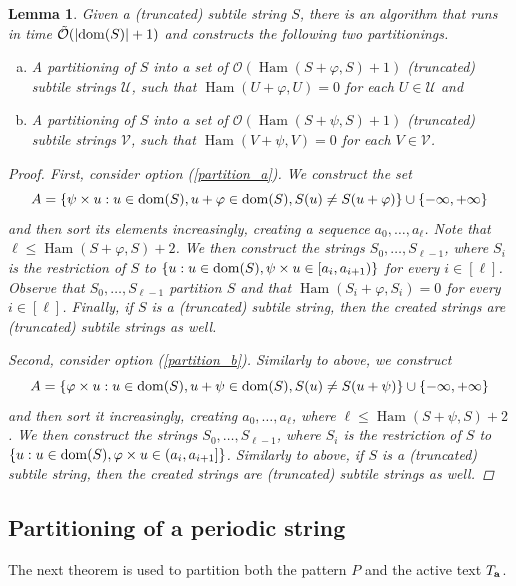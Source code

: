 \documentclass[11pt, letterpaper]{article}
\theoremstyle{plain}
\newtheorem{lemma}{Lemma}
\theoremstyle{definition}
\theoremstyle{remark}
\renewcommand{\O}{\mathcal{O}}
\newcommand{\tO}{\tilde{\mathcal{O}}}
\newcommand{\U}{\mathcal{U}}
\newcommand{\V}{\mathcal{V}}
\renewcommand{\phi}{\varphi}
\newcommand{\set}[1]{\left\lbrace #1 \right\rbrace}
\DeclareMathOperator*{\Ham}{Ham}
\newcommand{\absolute}[1]{\left\lvert#1\right\rvert}
\begin{document}
\begin{lemma}\label{cut_partitioning}
Given a (truncated) subtile string $S$, there is an algorithm that runs in time $\tO(\absolute{\d{S}} + 1)$ and constructs the following two partitionings.
	\begin{enumerate}[(a)]
		\item A partitioning of $S$ into a set of $\O(\Ham(S + \phi, S) + 1)$ (truncated) subtile strings $\U$, such that $\Ham(U + \phi, U) = 0$ for each $U \in \U$ and \label{partition_a}
		\item A partitioning of $S$ into a set of $\O(\Ham(S + \psi, S) + 1)$ (truncated) subtile strings $\V$, such that $\Ham(V + \psi, V) = 0$ for each $V \in \V$. \label{partition_b}
	\end{enumerate}
	\begin{proof}
		First, consider option (\ref{partition_a}). We construct the set
		\[ A = \set{\s{u} : u \in \d{S}, u + \phi \in \d{S}, S(u) \neq S(u + \phi)} \cup \set{-\infty, +\infty}\]
		and then sort its elements increasingly, creating a sequence $a_0, \dots, a_\ell$.
		Note that $\ell \le \Ham(S + \phi, S) + 2$.
		We then construct the strings $S_0, \dots, S_{\ell - 1}$, where $S_i$ is the restriction of $S$ to
		$\set{u : u \in \d{S}, \s{u} \in [a_i, a_{i + 1})}$ for every $i \in [\ell]$.
		Observe that $S_0, \dots, S_{\ell - 1}$ partition $S$ and that $\Ham(S_i + \phi, S_i) = 0$ for every $i \in [\ell]$. Finally, if $S$ is a (truncated) subtile string, then the created strings are (truncated) subtile strings as well.
	
		Second, consider option (\ref{partition_b}). Similarly to above, we construct
		\[ A = \set{\h{u} : u \in \d{S}, u + \psi \in \d{S}, S(u) \neq S(u + \psi)} \cup \set{-\infty, +\infty} \]
		and then sort it increasingly, creating $a_0, \dots, a_\ell$, where $\ell \le \Ham(S + \psi, S) + 2$.
		We then construct the strings $S_0, \dots, S_{\ell - 1}$, where $S_i$ is the restriction of $S$ to 
		$\set{u : u \in \d{S}, \h{u} \in (a_i, a_{i + 1}]}$. Similarly to above, if $S$ is a (truncated) subtile string, then the created strings are (truncated) subtile strings as well.
	\end{proof}
\end{lemma}


\subsection{Partitioning of a periodic string}
The next theorem is used to partition both the pattern $P$ and the active text $T_\mathbf{a}$.
\end{document}
